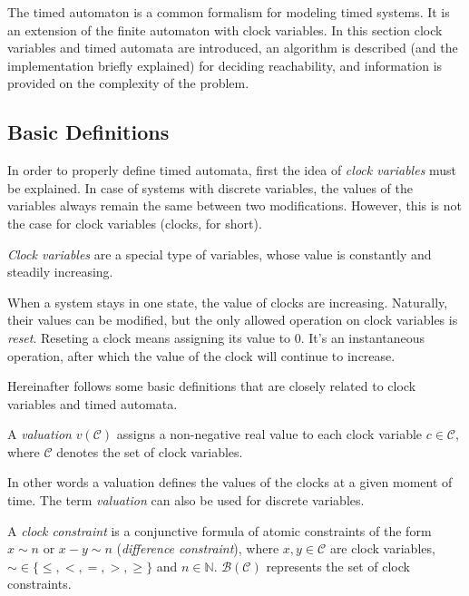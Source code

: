The timed automaton is a common formalism for modeling timed systems. It is an extension of the finite automaton with clock variables. In this section clock variables and timed automata are introduced, an algorithm is described (and the implementation briefly explained) for deciding reachability, and information is provided on the complexity of the problem.

\subsection{Basic Definitions}


In order to properly define timed automata, first the idea of \emph{clock variables} must be explained. In case of systems with discrete variables, the values of the variables always remain the same between two modifications. However, this is not the case for clock variables (clocks, for short).

\begin{dfn}
	\emph{Clock variables} are a special type of variables, whose value is constantly and steadily increasing.
\end{dfn}

When a system stays in one state, the value of clocks are increasing. Naturally, their values can be modified, but the only allowed operation on clock variables is \emph{reset}. Reseting a clock means assigning its value to 0. It's an instantaneous operation, after which the value of the clock will continue to increase.

Hereinafter follows some basic definitions that are closely related to clock variables and timed automata. 

\begin{dfn}
	A \emph{valuation} $v(\mathcal{C})$ assigns a non-negative real value
	to each clock variable $c \in \mathcal{C}$, where $\mathcal{C}$ denotes the set of clock
	variables.
\end{dfn}

In other words a valuation defines the values of the clocks at a given moment of time. The term \emph{valuation} can also be used for discrete variables.

\begin{dfn}
	A \emph{clock constraint} is a conjunctive formula of atomic
	constraints of the form $x \sim n$ or $x - y \sim n$ (\emph{difference
		constraint}), where $x,y \in \mathcal{C}$ are clock variables, $\sim \in \{\leq,<,=,>,\geq\}$ and \hbox{$n \in \mathbb{N}$}. $\mathcal{B}(\mathcal{C})$ represents the set of clock
	constraints.
\end{dfn}

